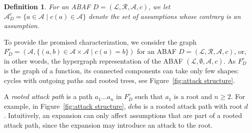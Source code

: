 \documentclass[letterpaper]{article} %
\newcommand{\TODO}[1]{\todo[inline]{ #1}}
\newcommand{\asms}{\asm}
\newcommand{\lit}{\ensuremath{\mathcal{L}}}
\newcommand{\asm}{\ensuremath{\mathcal{A}}}
\newcommand{\atoms}{\mathcal{L}}
\newcommand{\ruleset}{\mathcal{R}}
\newcommand{\assumptions}{\mathcal{A}}
\newcommand{\contra}{c}
\newcommand{\contrary}[1]{c(#1)}
\newcommand{\contraryempty}{c}
\newcommand{\ABAdef}{D=(\atoms,\ruleset,\assumptions,\contra)}
\newcommand{\contraryAF}[1]{F^{c}_{#1}}
\newcommand{\contraryArgs}[1]{\asm^{c}_{#1}}
\newtheorem{definition}[example]{Definition}
\begin{document}
%
\begin{definition}
%
    For an ABAF $\ABAdef$, we let $\contraryArgs{D}=\{a\in \asm\mid  \contrary{a}\in \asm\}$ denote the set of assumptions whose contrary is an assumption. 
\end{definition}

To provide the promised characterization, 
we consider the graph $\contraryAF{D}=(\asms, \{(a,b)\in\asms\times\asms\mid c(a)=b\})$ for an ABAF $\ABAdef$, or, in other words, the hypergraph representation of the ABAF $(\lit,\emptyset,\asms,\contraryempty)$.
As $\contraryAF{D}$ is the graph of a function, its connected components can take only few shapes: cycles with outgoing paths %
and rooted trees, see Figure~\ref{fig:attack structure}.





A \emph{rooted attack path} is a path $a_1\ldots a_n$ in $\contraryAF{D}$ such that $a_1$ is a root and $n\geq 2$.  
For example, in Figure~\ref{fig:attack structure}, $dcba$ is a rooted attack path with root $d$. Intuitively, an expansion can only affect assumptions that are part of a rooted attack path, since the expansion may introduce an attack to the root.%
\end{document}
